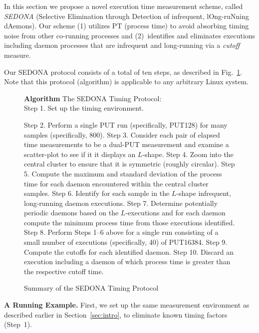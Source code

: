 \documentclass[letter]{ieice}
\begin{document}
In this section we propose a novel execution time measurement scheme, 
called {\em SEDONA} (Selective Elimination through Detection of infrequent, lOng-ruNning dAemons). 
Our scheme (1) utilizes PT (process time) to avoid absorbing timing noise from other co-running processes and (2)~identifies and eliminates executions including daemon processes that are infrequent and \hbox{long-running} via a {\em cutoff} measure. 

Our SEDONA protocol consists of a total of ten steps, as described in Fig.~\ref{alg:find}.
Note that this protocol (algorithm) is applicable to any arbitrary Linux system.

\begin{figure}[h]
\begin{center}
\begin{algorithmic}
{\bf Algorithm} The SEDONA Timing Protocol: \\
\STATE Step 1. Set up the timing environment.

{\color{blue}
\STATE Step 2. Perform a single PUT run (specifically, PUT128) for many samples (specifically, 800).
\STATE Step 3. Consider each pair of elapsed time measurements to be a dual-PUT measurement 
and examine a scatter-plot to see if it it displays an $L$-shape.
\STATE Step 4. Zoom into the central cluster to ensure that it is symmetric (roughly circular).
\STATE Step 5. Compute the maximum and standard deviation of the process time 
for each daemon encountered within the central cluster samples.
\STATE Step 6. Identify for each sample in the $L$-shape infrequent, long-running daemon executions. 
\STATE Step 7. Determine potentially periodic daemons based on the $L$-executions 
and for each daemon compute the minimum process time from those executions identified. 
\STATE Step 8. Perform Steps 1--6 above for a single run 
consisting of a small number of executions (specifically, 40) of PUT16384.  
\STATE Step 9. Compute the cutoffs for each identified daemon. 
}
\STATE Step 10. Discard an execution including a daemon of which process time is greater than the respective cutoff time.
\end{algorithmic}
\end{center}
\caption{Summary of the SEDONA Timing Protocol\label{alg:find}}
\vspace{-0.25in}
\end{figure}

{\bf A Running Example.} 
First, we set up the same measurement environment as described earlier in \hbox{Section}~\ref{sec:intro}, 
to eliminate known timing factors (Step~1).
\end{document}
